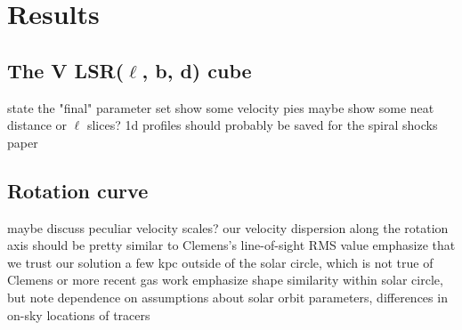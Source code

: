 \section{Results}
\label{sec:results}
\subsection{The V LSR($\ell$, b, d) cube}
state the "final" parameter set
show some velocity pies
maybe show some neat distance or $\ell$ slices? 1d profiles should probably be saved for the spiral shocks paper

\subsection{Rotation curve}
maybe discuss peculiar velocity scales? our velocity dispersion along the rotation axis should be pretty similar to Clemens’s line-of-sight RMS value emphasize that we trust our solution a few kpc outside of the solar circle, which is not true of Clemens or more recent gas work emphasize shape similarity within solar circle, but note dependence on assumptions about solar orbit parameters, differences in on-sky locations of tracers
